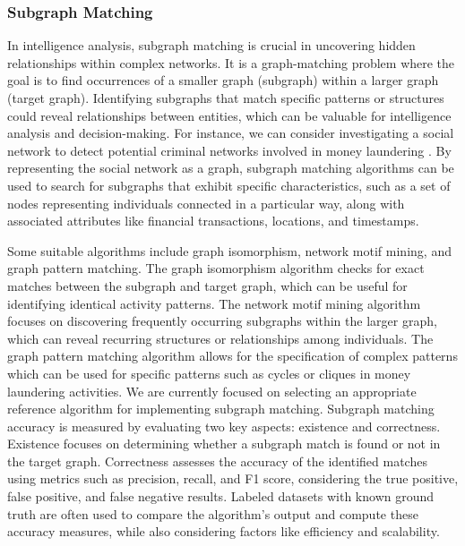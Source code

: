 \documentclass[letterpaper, 10pt]{article}
\begin{document}
\begin{multicols}{2}
{{        \subsubsection{Subgraph Matching}\label{section:subgraphMatching}
            In intelligence analysis, subgraph matching is crucial in uncovering hidden relationships within complex networks. 
            It is a graph-matching problem where the goal is to find occurrences of a smaller graph (subgraph) within a larger graph (target graph). 
            Identifying subgraphs that match specific patterns or structures could reveal relationships between entities, which can be valuable for intelligence analysis and decision-making. 
            For instance, we can consider investigating a social network to detect potential criminal networks involved in money laundering \cite{Soltani2016}. 
            By representing the social network as a graph, subgraph matching algorithms can be used to search for subgraphs that exhibit specific characteristics, such as a set of nodes representing individuals connected in a particular way, along with associated attributes like financial transactions, locations, and timestamps. 
            
            \par{Some suitable algorithms include graph isomorphism, network motif mining, and graph pattern matching. 
            The graph isomorphism algorithm \cite{Babai2016} checks for exact matches between the subgraph and target graph, which can be useful for identifying identical activity patterns. 
            The network motif mining algorithm \cite{Oliver2022}focuses on discovering frequently occurring subgraphs within the larger graph, which can reveal recurring structures or relationships among individuals. 
            The graph pattern matching algorithm \cite{Cheng2008} allows for the specification of complex patterns which can be used for specific patterns such as cycles or cliques in money laundering activities. 
            We are currently focused on selecting an appropriate reference algorithm for implementing subgraph matching. Subgraph matching accuracy is measured by evaluating two key aspects: existence and correctness. Existence focuses on determining whether a subgraph match is found or not in the target graph. Correctness assesses the accuracy of the identified matches using metrics such as precision, recall, and F1 score, considering the true positive, false positive, and false negative results. Labeled datasets with known ground truth are often used to compare the algorithm's output and compute these accuracy measures, while also considering factors like efficiency and scalability.} 

}}
\end{multicols}
\end{document}
